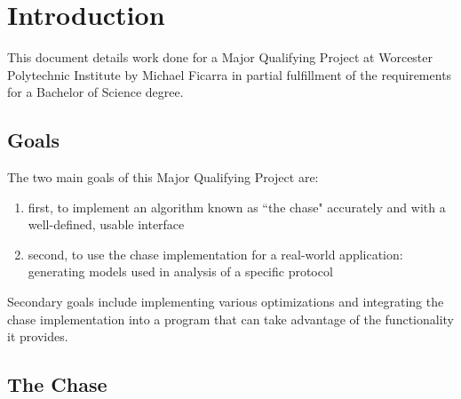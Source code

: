 \section{Introduction}

	This document details work done for a Major Qualifying Project at Worcester
	Polytechnic Institute by Michael Ficarra in partial fulfillment of the
	requirements for a Bachelor of Science degree.

	\subsection{Goals}

		The two main goals of this Major Qualifying Project are:

		\begin{enumerate}
		\item first, to implement an algorithm known as ``the chase" accurately
		and with a well-defined, usable interface
		\item second, to use the chase implementation for a real-world
		application: generating models used in analysis of a specific protocol
		\end{enumerate}

		Secondary goals include implementing various optimizations and
		integrating the chase implementation into a program that can take
		advantage of the functionality it provides.

	\subsection{The Chase}

		

